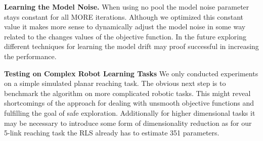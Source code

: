 \textbf{Learning the Model Noise.}
When using no pool the model noise
parameter stays constant for all MORE
iterations. Although we optimized this constant value it makes more sense to
dynamically adjust the model
noise in some way related to the changes values of the objective function.
In the future exploring different techniques for learning the model drift
may proof successful in increasing the performance.

\textbf{Testing on Complex Robot Learning Tasks}
We only conducted experiments on a simple simulated planar reaching
task. The obvious next step is to benchmark the algorithm on more
complicated robotic tasks. This might reveal shortcomings of the approach
for dealing with unsmooth objective functions and fulfilling the goal
of safe exploration.
Additionally for higher dimensional tasks it may be necessary to
introduce some form of dimensionality reduction as for our
5-link reaching task the RLS already has to estimate
351 parameters.
